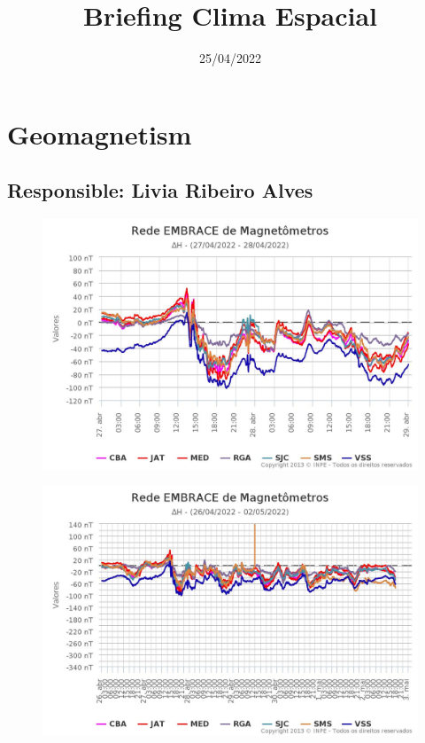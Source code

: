 \documentclass[11pt, oneside]{article}
\title{Briefing Clima Espacial}
\date{25/04/2022}
\begin{document}
\maketitle 

 \section{Geomagnetism} 
 \subsection{Responsible: Livia Ribeiro Alves} 
 
\begin{figure}[H]
    
                        \centering
   
                             \includegraphics[width=14cm]{./figures/figureGeomag_0.png}

                        \end{figure}

                     \begin{figure}[H]
    
                        \centering
   
                             \includegraphics[width=14cm]{./figures/figureGeomag_1.png}

                        \end{figure}
\end{document}
